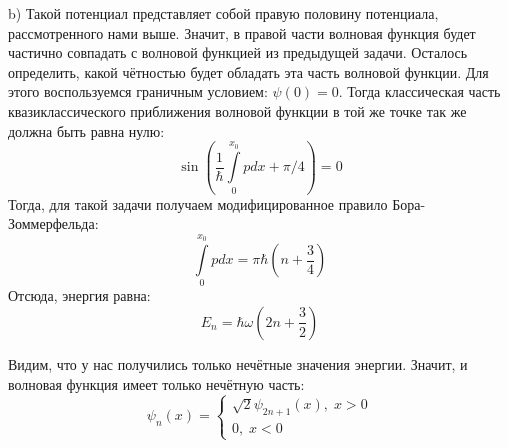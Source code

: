 b) Такой потенциал представляет собой правую половину потенциала, рассмотренного нами выше. Значит, в правой части волновая функция будет частично совпадать с волновой функцией из предыдущей задачи. Осталось определить, какой чётностью будет обладать эта часть волновой функции. Для этого воспользуемся граничным условием: $\psi(0) = 0$. Тогда классическая часть квазиклассического приближения волновой функции в той же точке так же должна быть равна нулю:
\[
\sin\left(\frac{1}{\hbar}\int\limits_0^{x_0} p dx + \pi/4 \right) = 0
\]
Тогда, для такой задачи получаем модифицированное правило Бора-Зоммерфельда:
\[
\int\limits_0^{x_0} p dx = \pi\hbar\left(n +\frac{3}{4} \right)
\]
Отсюда, энергия равна:
\[
E_n = \hbar\omega(2n + \frac{3}{2})
\]

Видим, что у нас получились только нечётные значения энергии. Значит, и волновая функция имеет только нечётную часть:
\[
\psi_n(x) =
\begin{cases}
    \sqrt{2}\psi_{2n+1}(x), \; x > 0\\
    0, \; x < 0
\end{cases}
\]
